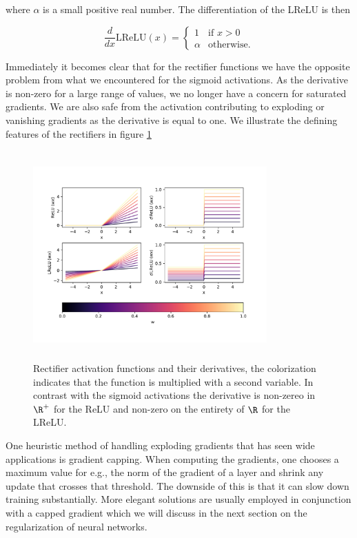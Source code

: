 \noindent where $\alpha$ is a small positive real number. The differentiation of the LReLU is then 

\begin{equation}\label{eq:lrelu}
    \frac{d}{dx}\text{LReLU} (x) = \begin{cases}
    1 & \text{if } x > 0 \\
    \alpha & \text{otherwise}.
    \end{cases}
\end{equation}

\noindent Immediately it becomes clear that for the rectifier functions we have the opposite problem from what we encountered for the sigmoid activations. As the derivative is non-zero for a large range of values, we no longer have a concern for saturated gradients. We are also safe from the activation contributing to exploding or vanishing gradients as the derivative is equal to one. We illustrate the defining features of the rectifiers in figure \ref{fig:elu}

\begin{figure}[ht]
\centering
\includegraphics[width=0.8\textwidth, height=8cm]{../figures/activationselus.pdf}
\caption[Rectifier activation functions]{Rectifier activation functions and their derivatives, the colorization indicates that the function is multiplied with a second variable. In contrast with the sigmoid activations the derivative is non-zereo in $\R^+$ for the ReLU and non-zero on the entirety of $\R$ for the LReLU.}\label{fig:elu}
\end{figure}

One heuristic method of handling exploding gradients that has seen wide applications is gradient capping. When computing the gradients, one chooses a maximum value for e.g., the norm of the gradient of a layer and shrink any update that crosses that threshold. The downside of this is that it can slow down training substantially. More elegant solutions are usually employed in conjunction with a capped gradient which we will discuss in the next section on the regularization of neural networks. 


